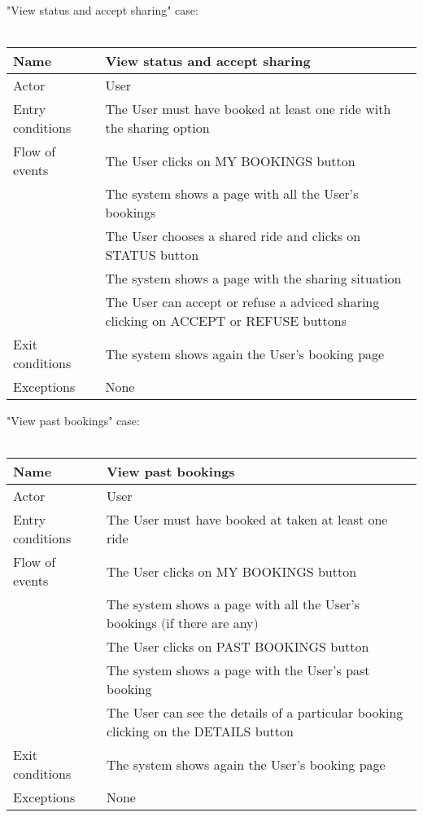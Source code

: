 \newpage
"View status and accept sharing" case:
\\
\\
\begin{tabular}{|l|p{10cm}|} 
\hline
Name & View status and accept sharing\\
\hline
Actor & User\\
\hline
Entry conditions & The User must have booked at least one ride with the sharing option\\
\hline
Flow of events
			&	\tabitem The User clicks on MY BOOKINGS button\\
			&	\tabitem The system shows a page with all the User's bookings\\
			&	\tabitem The User chooses a shared ride and clicks on STATUS button\\
			&	\tabitem The system shows a page with the sharing situation\\
			&	\tabitem The User can accept or refuse a adviced sharing clicking on ACCEPT or REFUSE buttons\\
	
\hline
Exit conditions & The system shows again the User's booking page\\
\hline
Exceptions & None\\
\hline
\end {tabular}

\newpage
"View past bookings" case:
\\
\\
\begin{tabular}{|l|p{10cm}|} 
\hline
Name & View past bookings\\
\hline
Actor & User\\
\hline
Entry conditions & The User must have booked at taken at least one ride\\
\hline
Flow of events
			&	\tabitem The User clicks on MY BOOKINGS button\\
			&	\tabitem The system shows a page with all the User's bookings $($if there are any$)$\\
			&	\tabitem The User clicks on PAST BOOKINGS button\\
			&	\tabitem The system shows a page with the User's past booking\\
			&	\tabitem The User can see the details of a particular booking clicking on the DETAILS button\\
	
\hline
Exit conditions & The system shows again the User's booking page\\
\hline
Exceptions & None\\
\hline
\end {tabular}

